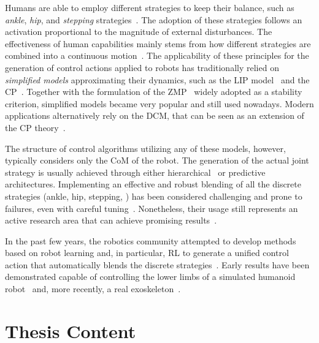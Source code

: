 Humans are able to employ different strategies to keep their balance, such as \emph{ankle}, \emph{hip}, and \emph{stepping} strategies~\parencite{nashner_organization_1985, maki_role_1997, stephens_humanoid_2007}.
The adoption of these strategies follows an activation proportional to the magnitude of external disturbances.
The effectiveness of human capabilities mainly stems from how different strategies are combined into a continuous motion~\parencite{mcgreavy_unified_2020}.
The applicability of these principles for the generation of control actions applied to robots has traditionally relied on \emph{simplified models} approximating their dynamics, such as the \ac{LIP} model~\parencite{kajita_3d_2001} and the \ac{CP}~\parencite{pratt_capture_2006}.
Together with the formulation of the \ac{ZMP}~\parencite{vukobratovic_contribution_1969, vukobratovic_zero-moment_2004} widely adopted as a stability criterion, simplified models became very popular and still used nowadays.
Modern applications alternatively rely on the \ac{DCM}, that can be seen as an extension of the \ac{CP} theory~\parencite{shafiee_online_2019}.

The structure of control algorithms utilizing any of these models, however, typically considers only the \ac{CoM} of the robot.
The generation of the actual joint strategy is usually achieved through either hierarchical~\parencite{feng_optimization_2014} or predictive~\parencite{wieber_trajectory_2006, aftab_ankle_2012} architectures.
Implementing an effective and robust blending of all the discrete strategies (ankle, hip, stepping, \etc) has been considered challenging and prone to failures, even with careful tuning~\parencite{mcgreavy_unified_2020}.
Nonetheless, their usage still represents an active research area that can achieve promising results~\parencite{jeong_robust_2019}.

In the past few years, the robotics community attempted to develop methods based on robot learning and, in particular, \ac{RL} to generate a unified control action that automatically blends the discrete strategies~\parencite{yang_learning_2018}.
Early results have been demonstrated capable of controlling the lower limbs of a simulated humanoid robot~\parencite{kim_push_2019} and, more recently, a real exoskeleton~\parencite{duburcq_reactive_2022}.

\section{Thesis Content}
\label{sec:thesis_content}

